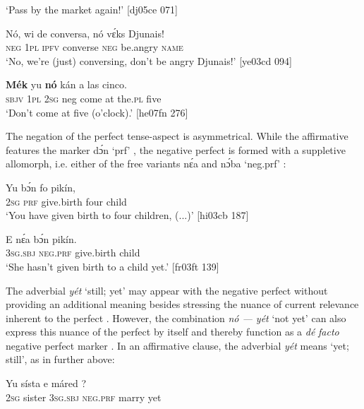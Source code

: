 \glt ‘Pass by the market again!’ [dj05ce 071]
\z


\ea%
    \label{ex:key:539}
    \gll Nó,  wi  de  conversa,  nó  vɛ́ks    Djunais!\\
\textsc{neg}  \textsc{1pl}  \textsc{ipfv}  converse    \textsc{neg}  be.angry  \textsc{name}\\

\glt ‘No, we’re (just) conversing, don’t be angry Djunais!’ [ye03cd 094]
\z


\ea%
    \label{ex:key:540}
    \gll \textbf{Mék}    yu  \textbf{nó}  kán    a  las    cinco.\\
{\textsc{sbjv}  \textsc{1pl}}  \textsc{2sg}  neg  come  at  the.\textsc{pl}  five  \\

\glt ‘Don’t come at five (o’clock).’ [he07fn 276]
\z

The negation of the perfect tense-aspect is asymmetrical. While the affirmative features the marker dɔ́n ‘prf’ , the negative perfect is formed with a suppletive allomorph, i.e. either of the free variants nɛ́a and nɔ́ba ‘neg.prf’ : 


\ea%
    \label{ex:key:541}
    \gll Yu    bɔ́n      fo    pikín,  \\
\textsc{2sg}  \textsc{prf}  give.birth  four    child\\

\glt ‘You have given birth to four children, (...)’ [hi03cb 187]
\z


\ea%
    \label{ex:key:542}
    \gll E    nɛ́a    bɔ́n      pikín.\\
\textsc{3sg.sbj}  \textsc{neg}.\textsc{prf}  give.birth  child\\

\glt ‘She hasn’t given birth to a child yet.’ [fr03ft 139]
\z

The adverbial \textit{yét} ‘still; yet’ may appear with the negative perfect without providing an additional meaning besides stressing the nuance of current relevance inherent to the perfect . However, the combination \textit{nó — yét} ‘not yet’ can also express this nuance of the perfect by itself and thereby function as a \textit{dé} \textit{facto} negative perfect marker . In an affirmative clause, the adverbial \textit{yét} means ‘yet; still’, as in  further above:


\ea%
    \label{ex:key:543}
    \gll Yu  sísta    e      máred  ?\\
\textsc{2sg}  sister  \textsc{3sg.sbj}  \textsc{neg}.\textsc{prf}  marry  yet\\


